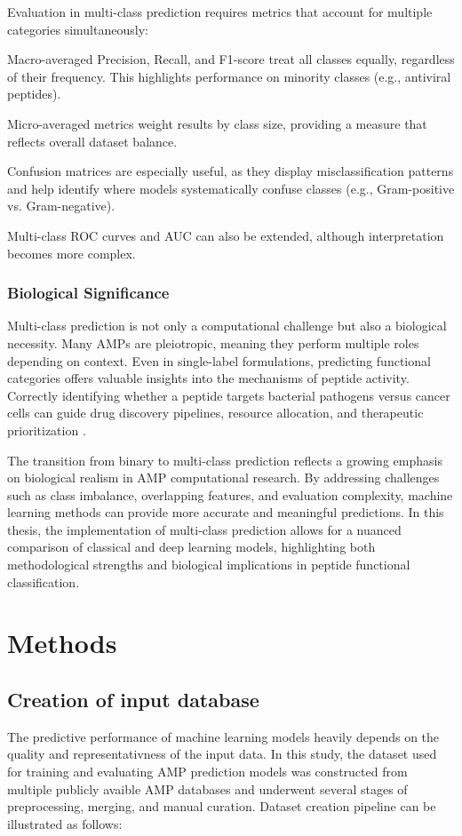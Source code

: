 \documentclass[a4paper,twoside,12pt]{book}
\begin{document}
Evaluation in multi-class prediction requires metrics that account for multiple categories simultaneously:

Macro-averaged Precision, Recall, and F1-score treat all classes equally, regardless of their frequency. This highlights performance on minority classes (e.g., antiviral peptides).

Micro-averaged metrics weight results by class size, providing a measure that reflects overall dataset balance.

Confusion matrices are especially useful, as they display misclassification patterns and help identify where models systematically confuse classes (e.g., Gram-positive vs. Gram-negative).

Multi-class ROC curves and AUC can also be extended, although interpretation becomes more complex.

\subsection{Biological Significance}

Multi-class prediction is not only a computational challenge but also a biological necessity. Many AMPs are pleiotropic, meaning they perform multiple roles depending on context. Even in single-label formulations, predicting functional categories offers valuable insights into the mechanisms of peptide activity. Correctly identifying whether a peptide targets bacterial pathogens versus cancer cells can guide drug discovery pipelines, resource allocation, and therapeutic prioritization \cite{bib:kumar2021}.


The transition from binary to multi-class prediction reflects a growing emphasis on biological realism in AMP computational research. By addressing challenges such as class imbalance, overlapping features, and evaluation complexity, machine learning methods can provide more accurate and meaningful predictions. In this thesis, the implementation of multi-class prediction allows for a nuanced comparison of classical and deep learning models, highlighting both methodological strengths and biological implications in peptide functional classification.


\chapter{Methods}


\section{Creation of input database}
The predictive performance of machine learning models heavily depends on the quality and representativness of the input data. In this study, the dataset used for training and
evaluating AMP prediction models was constructed from multiple publicly avaible AMP databases and underwent several stages of preprocessing, merging, and manual curation.
Dataset creation pipeline can be illustrated as follows:
\end{document}
